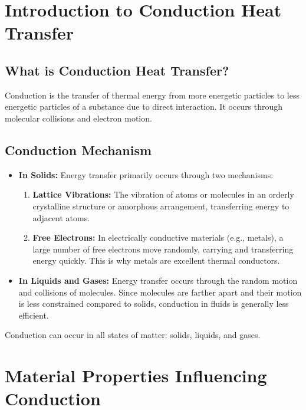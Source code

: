 \section{Introduction to Conduction Heat Transfer}

\subsection{What is Conduction Heat Transfer?}
Conduction is the transfer of thermal energy from more energetic particles to less energetic particles of a substance due to direct interaction. It occurs through molecular collisions and electron motion.

\subsection{Conduction Mechanism}
\begin{itemize}
    \item \textbf{In Solids:} Energy transfer primarily occurs through two mechanisms:
        \begin{enumerate}
            \item \textbf{Lattice Vibrations:} The vibration of atoms or molecules in an orderly crystalline structure or amorphous arrangement, transferring energy to adjacent atoms.
            \item \textbf{Free Electrons:} In electrically conductive materials (e.g., metals), a large number of free electrons move randomly, carrying and transferring energy quickly. This is why metals are excellent thermal conductors.
        \end{enumerate}
    \item \textbf{In Liquids and Gases:} Energy transfer occurs through the random motion and collisions of molecules. Since molecules are farther apart and their motion is less constrained compared to solids, conduction in fluids is generally less efficient.
\end{itemize}
Conduction can occur in all states of matter: solids, liquids, and gases.

\section{Material Properties Influencing Conduction}

